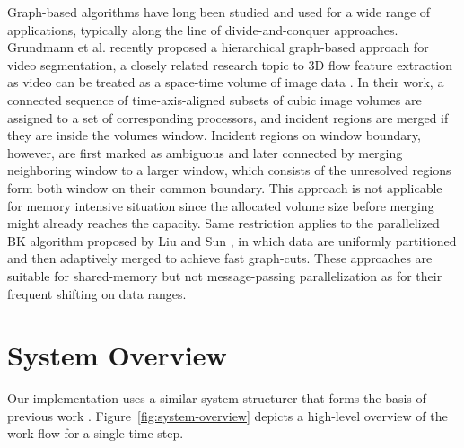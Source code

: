 \documentclass[10pt, conference, compsocconf]{IEEEtran}
\begin{document}
Graph-based algorithms have long been studied and used for a wide range of applications, typically along the line of divide-and-conquer approaches.
Grundmann et al. \cite{Grundmann2010} recently proposed a hierarchical graph-based approach for video segmentation, a closely related research topic to 3D flow feature extraction as video can be treated as a space-time volume of image data \cite{Klein2002}. In their work, a connected sequence of time-axis-aligned subsets of cubic image volumes are assigned to a set of corresponding processors, and incident regions are merged if they are inside the volumes window. Incident regions on window boundary, however, are first marked as ambiguous and later connected by merging neighboring window to a larger window, which consists of the unresolved regions form both window on their common boundary. This approach is not applicable for memory intensive situation since the allocated volume size before merging might already reaches the capacity. Same restriction applies to the parallelized BK algorithm \cite{Boykov2004} proposed by Liu and Sun \cite{Liu2010}, in which data are uniformly partitioned and then adaptively merged to achieve fast graph-cuts. These approaches are suitable for shared-memory but not message-passing parallelization as for their frequent shifting on data ranges.

\section{System Overview}
Our implementation uses a similar system structurer that forms the basis of previous work \cite{Muelder2009}. Figure~\ref{fig:system-overview} depicts a high-level overview of the work flow for a single time-step.
\end{document}

